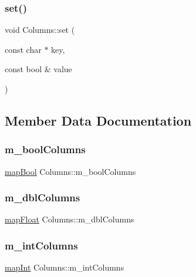 \subsubsection{\texorpdfstring{set()}{set()}\hspace{0.1cm}{\footnotesize\ttfamily [4/4]}}
{\footnotesize\ttfamily void Columns\+::set (\begin{DoxyParamCaption}\item[{const char $\ast$}]{key,  }\item[{const bool \&}]{value }\end{DoxyParamCaption})}



\subsection{Member Data Documentation}
\mbox{\label{classColumns_a454542a78d6dc1013881e2c3abdbd9f7}} 
\subsubsection{\texorpdfstring{m\+\_\+bool\+Columns}{m\_boolColumns}}
{\footnotesize\ttfamily \mbox{\hyperlink{datadefinition_8h_a143e5002d845b09ca5dcaf1eda71d70f}{map\+Bool}} Columns\+::m\+\_\+bool\+Columns}

\mbox{\label{classColumns_ac0b423f0dcaa97fe42e2a0283c13d9bc}} 
\subsubsection{\texorpdfstring{m\+\_\+dbl\+Columns}{m\_dblColumns}}
{\footnotesize\ttfamily \mbox{\hyperlink{datadefinition_8h_aeaff661fb97ce7aa76f32e7e308f3a15}{map\+Float}} Columns\+::m\+\_\+dbl\+Columns}

\mbox{\label{classColumns_a8cbc620473c96a5e587fec5a7d7be695}} 
\subsubsection{\texorpdfstring{m\+\_\+int\+Columns}{m\_intColumns}}
{\footnotesize\ttfamily \mbox{\hyperlink{datadefinition_8h_aea73dfd4c959e6737c9c65474e4529ec}{map\+Int}} Columns\+::m\+\_\+int\+Columns}

